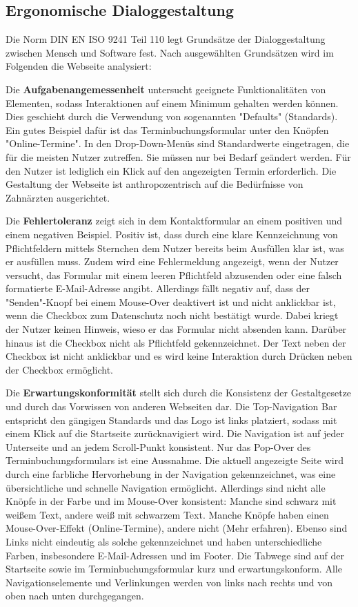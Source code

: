 \subsection{Ergonomische Dialoggestaltung} \label{sec:dialoggestaltung}

Die Norm DIN EN ISO 9241 Teil 110 legt Grundsätze der Dialoggestaltung zwischen Mensch und Software fest. Nach ausgewählten Grundsätzen wird im Folgenden die Webseite analysiert:

Die \textbf{Aufgabenangemessenheit} untersucht geeignete Funktionalitäten von Elementen, sodass Interaktionen auf einem Minimum gehalten werden können. Dies geschieht durch die Verwendung von sogenannten "Defaults" (Standards). Ein gutes Beispiel dafür ist das Terminbuchungsformular unter den Knöpfen "Online-Termine". In den Drop-Down-Menüs sind Standardwerte eingetragen, die für die meisten Nutzer zutreffen. Sie müssen nur bei Bedarf geändert werden. Für den Nutzer ist lediglich ein Klick auf den angezeigten Termin erforderlich. Die Gestaltung der Webseite ist anthropozentrisch auf die Bedürfnisse von Zahnärzten ausgerichtet.

Die \textbf{Fehlertoleranz} zeigt sich in dem Kontaktformular an einem positiven und einem negativen Beispiel. Positiv ist, dass durch eine klare Kennzeichnung von Pflichtfeldern mittels Sternchen dem Nutzer bereits beim Ausfüllen klar ist, was er ausfüllen muss. Zudem wird eine Fehlermeldung angezeigt, wenn der Nutzer versucht, das Formular mit einem leeren Pflichtfeld abzusenden oder eine falsch formatierte E-Mail-Adresse angibt. Allerdings fällt negativ auf, dass der "Senden"-Knopf bei einem Mouse-Over deaktivert ist und nicht anklickbar ist, wenn die Checkbox zum Datenschutz noch nicht bestätigt wurde. Dabei kriegt der Nutzer keinen Hinweis, wieso er das Formular nicht absenden kann. Darüber hinaus ist die Checkbox nicht als Pflichtfeld gekennzeichnet. Der Text neben der Checkbox ist nicht anklickbar und es wird keine Interaktion durch Drücken neben der Checkbox ermöglicht.

Die \textbf{Erwartungskonformität} stellt sich durch die Konsistenz der Gestaltgesetze und durch das Vorwissen von anderen Webseiten dar. Die Top-Navigation Bar entspricht den gängigen Standards und das Logo ist links platziert, sodass mit einem Klick auf die Startseite zurücknavigiert wird. Die Navigation ist auf jeder Unterseite und an jedem Scroll-Punkt konsistent. Nur das Pop-Over des Terminbuchungsformulars ist eine Aussnahme. Die aktuell angezeigte Seite wird durch eine farbliche Hervorhebung in der Navigation gekennzeichnet, was eine übersichtliche und schnelle Navigation ermöglicht. Allerdings sind nicht alle Knöpfe in der Farbe und im Mouse-Over konsistent: Manche sind schwarz mit weißem Text, andere weiß mit schwarzem Text. Manche Knöpfe haben einen Mouse-Over-Effekt (Online-Termine), andere nicht (Mehr erfahren). Ebenso sind Links nicht eindeutig als solche gekennzeichnet und haben unterschiedliche Farben, insbesondere E-Mail-Adressen und im Footer. Die Tabwege sind auf der Startseite sowie im Terminbuchungsformular kurz und erwartungskonform. Alle Navigationselemente und Verlinkungen werden von links nach rechts und von oben nach unten durchgegangen.


